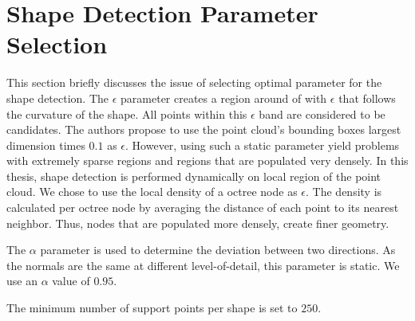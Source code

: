 \section{Shape Detection Parameter Selection}
\label{sec:shapeDetectionParameterSelection}
This section briefly discusses the issue of selecting optimal parameter for the shape detection. The $\epsilon$ parameter creates a region around of with $\epsilon$ that follows the curvature of the shape. All points within this $\epsilon$ band are considered to be candidates. The authors propose to use the point cloud's bounding boxes largest dimension times $0.1$ as $\epsilon$. However, using such a static parameter yield problems with extremely sparse regions and regions that are populated very densely. In this thesis, shape detection is performed dynamically on local region of the point cloud. We chose to use the local density of a octree node as $\epsilon$. The density is calculated per octree node by averaging the distance of each point to its nearest neighbor. Thus, nodes that are populated more densely, create finer geometry. 

The $\alpha$ parameter is used to determine the deviation between two directions. As the normals are the same at different level-of-detail, this parameter is static. We use an $\alpha$ value of $0.95$. 

The minimum number of support points per shape is set to $250$.



